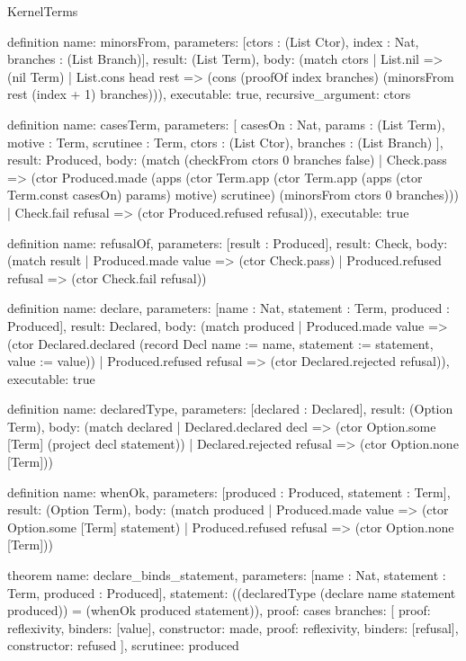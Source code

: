 \begin{lexlean}{KernelTerms}
\begin{semanticmodule}
definition{
  name: minorsFrom,
  parameters: [ctors : (List Ctor), index : Nat, branches : (List Branch)],
  result: (List Term),
  body: (match ctors
    | List.nil => (nil Term)
    | List.cons head rest => (cons (proofOf index branches) (minorsFrom rest (index + 1) branches))),
  executable: true,
  recursive_argument: ctors
}

definition{
  name: casesTerm,
  parameters: [
    casesOn : Nat,
    params : (List Term),
    motive : Term,
    scrutinee : Term,
    ctors : (List Ctor),
    branches : (List Branch)
  ],
  result: Produced,
  body: (match (checkFrom ctors 0 branches false)
    | Check.pass => (ctor Produced.made (apps (ctor Term.app (ctor Term.app (apps (ctor Term.const casesOn) params) motive) scrutinee) (minorsFrom ctors 0 branches)))
    | Check.fail refusal => (ctor Produced.refused refusal)),
  executable: true
}

definition{
  name: refusalOf,
  parameters: [result : Produced],
  result: Check,
  body: (match result
    | Produced.made value => (ctor Check.pass)
    | Produced.refused refusal => (ctor Check.fail refusal))
}

definition{
  name: declare,
  parameters: [name : Nat, statement : Term, produced : Produced],
  result: Declared,
  body: (match produced
    | Produced.made value => (ctor Declared.declared (record Decl {name := name, statement := statement, value := value}))
    | Produced.refused refusal => (ctor Declared.rejected refusal)),
  executable: true
}

definition{
  name: declaredType,
  parameters: [declared : Declared],
  result: (Option Term),
  body: (match declared
    | Declared.declared decl => (ctor Option.some [Term] (project decl statement))
    | Declared.rejected refusal => (ctor Option.none [Term]))
}

definition{
  name: whenOk,
  parameters: [produced : Produced, statement : Term],
  result: (Option Term),
  body: (match produced
    | Produced.made value => (ctor Option.some [Term] statement)
    | Produced.refused refusal => (ctor Option.none [Term]))
}

theorem{
  name: declare_binds_statement,
  parameters: [name : Nat, statement : Term, produced : Produced],
  statement: ((declaredType (declare name statement produced)) = (whenOk produced statement)),
  proof: cases{
    branches: [
      {proof: reflexivity{}, binders: [value], constructor: made},
      {proof: reflexivity{}, binders: [refusal], constructor: refused}
    ],
    scrutinee: produced
  }
}


\end{semanticmodule}
\end{lexlean}
